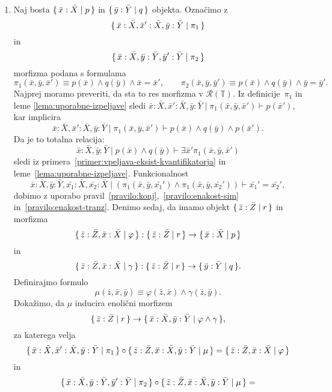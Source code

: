 \documentclass[../kategoricna_logika.tex]{subfiles}
\begin{document}
\begin{dokaz}
\begin{enumerate}[label=(\roman*)]
    \item Naj bosta $\lbrace\,\bar{x}:\bar{X} \mid p\,\rbrace$ in $\lbrace\,\bar{y}:\bar{Y} \mid q\,\rbrace$ objekta.
      Označimo z $$\lbrace\,\bar{x}:\bar{X}, \bar{x}':\bar{X}, \bar{y}:\bar{Y} \mid \pi_1\,\rbrace$$
      in
      $$\lbrace\,\bar{x}:\bar{X},\bar{y}:\bar{Y},\bar{y}':\bar{Y} \mid  \pi_2\,\rbrace$$
      morfizma podana s
      formulama
      \[ \pi_1(\bar{x},\bar{y},\bar{x}') \equiv p(\bar{x}) \land q(\bar{y}) \land \bar{x}=\bar{x}', \qquad
        \pi_2(\bar{x},\bar{y},\bar{y}') \equiv p(\bar{x}) \land q(\bar{y}) \land \bar{y}=\bar{y}'.
      \]
      Najprej moramo preveriti, da sta to res morfizma v
      $\mathcal{R}(\mathbb{T})$.  Iz definicije~$\pi_1$ in leme
      \ref{lema:uporabne-izpeljave} sledi
      $\bar{x}:\bar{X},\bar{x}':\bar{X},\bar{y}:\bar{Y} \mid \pi_1(\bar{x},\bar{y},\bar{x}') \vdash  p(\bar{x}')$, kar implicira
    $$\bar{x}:\bar{X},\bar{x}':\bar{X},\bar{y}:\bar{Y} \mid \pi_1(\bar{x},\bar{y},\bar{x}') \vdash p(\bar{x}) \land q(\bar{y}) \land p(\bar{x}').$$
    Da je to totalna relacija:
    $$\bar{x}:\bar{X},\bar{y}:\bar{Y} \mid p(\bar{x}) \land q(\bar{y}) \vdash \exists \bar{x}' \pi_1(\bar{x},\bar{y},\bar{x}')$$
    sledi iz
    primera~\ref{primer:vpeljava-eksist-kvantifikatorja} in leme~\ref{lema:uporabne-izpeljave}.
    Funkcionalnost
    \[ \bar{x}:\bar{X},\bar{y}:\bar{Y},\bar{x_1}:\bar{X},\bar{x_2}:\bar{X} \mid (\pi_1(\bar{x},\bar{y},\bar{x_1}') \land
      \pi_1(\bar{x},\bar{y},\bar{x_2}')) \vdash \bar{x_1}' = \bar{x_2}',\]
    dobimo z uporabo pravil~\ref{pravilo:konj},~\ref{pravilo:enakost-sim} in~\ref{pravilo:enakost-tranz}.
    Denimo sedaj, da imamo objekt $\lbrace\,\bar{z}:\bar{Z} \mid r\,\rbrace$ in morfizma
    $${\lbrace\,\bar{z}:\bar{Z},\bar{x}:\bar{X} \mid \varphi\,\rbrace :
      \lbrace\,\bar{z}:\bar{Z} \mid r\,\rbrace \to \lbrace\,\bar{x}:\bar{X} \mid p\,\rbrace}$$
    in
    $$\lbrace\,\bar{z}:\bar{Z},\bar{x}:\bar{X} \mid \gamma\,\rbrace :
    \lbrace\,\bar{z}:\bar{Z} \mid r\,\rbrace \to \lbrace\,\bar{y}:\bar{Y} \mid q\,\rbrace.$$
    Definirajmo formulo
    \[ \mu(\bar{z},\bar{x},\bar{y}) \equiv \varphi(\bar{z},\bar{x}) \land \gamma(\bar{z},\bar{y}). \]
    Dokažimo, da $\mu$ inducira enolični morfizem
    $$\lbrace\,\bar{z}:\bar{Z} \mid r\,\rbrace \to \lbrace\,\bar{x}:\bar{X},\bar{y}:\bar{Y} \mid \varphi \land \gamma\,\rbrace,$$
    za
    katerega velja
    $$\lbrace\,\bar{x}:\bar{X}, \bar{x}':\bar{X}, \bar{y}:\bar{Y} \mid \pi_1\,\rbrace \circ
    \lbrace\,\bar{z}:\bar{Z},\bar{x}:\bar{X},\bar{y}:\bar{Y} \mid \mu\,\rbrace =
    \lbrace\,\bar{z}:\bar{Z},\bar{x}:\bar{X} \mid \varphi\,\rbrace$$
    in
    $$\lbrace\,\bar{x}:\bar{X},\bar{y}:\bar{Y},\bar{y}':\bar{Y} \mid  \pi_2\,\rbrace \circ
    \lbrace\,\bar{z}:\bar{Z},\bar{x}:\bar{X},\bar{y}:\bar{Y} \mid \mu\,\rbrace =
$$
\end{enumerate}
\end{dokaz}
\end{document}
